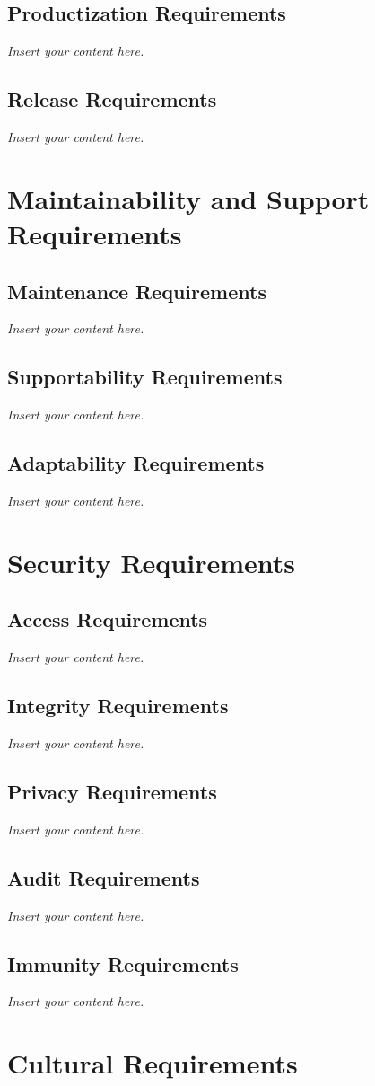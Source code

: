 \documentclass[12pt]{article}
\newcommand{\lips}{\textit{Insert your content here.}}
\begin{document}
\subsection{Productization Requirements}
\lips
\subsection{Release Requirements}
\lips

\section{Maintainability and Support Requirements}
\subsection{Maintenance Requirements}
\lips
\subsection{Supportability Requirements}
\lips
\subsection{Adaptability Requirements}
\lips

\section{Security Requirements}
\subsection{Access Requirements}
\lips
\subsection{Integrity Requirements}
\lips
\subsection{Privacy Requirements}
\lips
\subsection{Audit Requirements}
\lips
\subsection{Immunity Requirements}
\lips

\section{Cultural Requirements}
\end{document}
